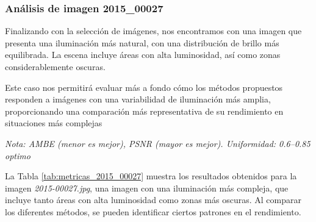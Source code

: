 \documentclass[sigchi]{acmart}
\begin{document}
\subsubsection{Análisis de imagen 2015\_00027}

Finalizando con la selección de imágenes, nos encontramos con una imagen que presenta una
iluminación más natural, con una distribución de brillo más equilibrada. La escena incluye
áreas con alta luminosidad, así como zonas considerablemente oscuras.

Este caso nos permitirá evaluar más a fondo cómo los métodos propuestos responden a imágenes
con una variabilidad de iluminación más amplia, proporcionando una comparación más
representativa de su rendimiento en situaciones más complejas

\begin{table}[H]
	\centering
	\caption{Métricas de calidad para la imagen 2015\_00027.jpg}
	\label{tab:metricas_2015_00027}
	\vspace{0.5em}


	\vspace{0.5em}
	\footnotesize%
	\textit{Nota: AMBE (menor es mejor), PSNR (mayor es mejor). Uniformidad: 0.6–0.85 optimo}
\end{table}

La Tabla \ref{tab:metricas_2015_00027} muestra los resultados obtenidos para la imagen
\emph{2015-00027.jpg}, una imagen con una iluminación más compleja, que incluye tanto áreas con alta
luminosidad como zonas más oscuras. Al comparar los diferentes métodos, se pueden identificar
ciertos patrones en el rendimiento.
\end{document}
